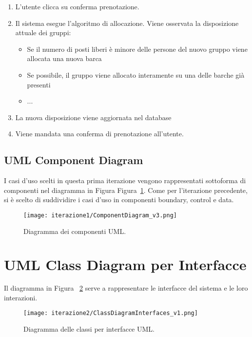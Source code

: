 \begin{enumerate}
    \item L'utente clicca su conferma prenotazione.
    \item Il sistema esegue l'algoritmo di allocazione. Viene osservata la disposizione attuale dei gruppi:
    \begin{itemize}
        \item Se il numero di posti liberi è minore delle persone del nuovo gruppo viene allocata una nuova barca
        \item Se possibile, il gruppo viene allocato interamente su una delle barche già presenti
        \item ...
    \end{itemize}
    \item La nuova disposizione viene aggiornata nel database
    \item Viene mandata una conferma di prenotazione all'utente.
\end{enumerate}

\subsection{UML Component Diagram}
I casi d’uso scelti in questa prima iterazione vengono rappresentati sottoforma di componenti nel diagramma in Figura Figura~\ref{fig:componentDiagram2}. Come per l'iterazione precedente, si è scelto di suddividire i casi d’uso in componenti boundary, control e data.

\begin{figure}[htbp]
    \texttt{[image: iterazione1/ComponentDiagram\_v3.png]}
    \centering
    \caption{Diagramma dei componenti UML.}\label{fig:componentDiagram2}
\end{figure}

\section{UML Class Diagram per Interfacce}
Il diagramma in Figura ~\ref{fig:ClassDiagramInterfaces2} serve a rappresentare le interfacce del sistema e le
loro interazioni.

\begin{figure}[htbp]
    \texttt{[image: iterazione2/ClassDiagramInterfaces\_v1.png]}
    \centering
    \caption{Diagramma delle classi per interfacce UML.}\label{fig:ClassDiagramInterfaces2}
\end{figure}

